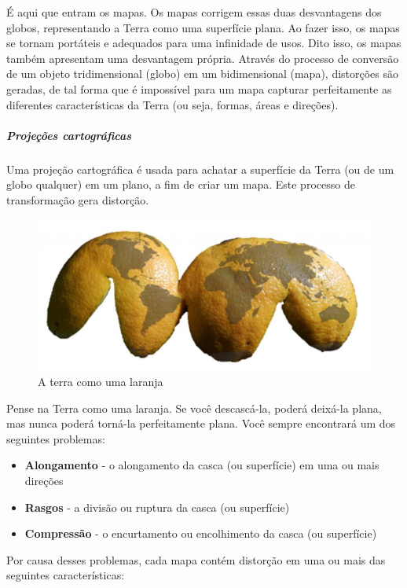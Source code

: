 \documentclass[
]{book}
\providecommand{\tightlist}{%
  \setlength{\itemsep}{0pt}\setlength{\parskip}{0pt}}
\begin{document}
É aqui que entram os mapas. Os mapas corrigem essas duas desvantagens dos globos, representando a Terra como uma superfície plana. Ao fazer isso, os mapas se tornam portáteis e adequados para uma infinidade de usos. Dito isso, os mapas também apresentam uma desvantagem própria. Através do processo de conversão de um objeto tridimensional (globo) em um bidimensional (mapa), distorções são geradas, de tal forma que é impossível para um mapa capturar perfeitamente as diferentes características da Terra (ou seja, formas, áreas e direções).

\hypertarget{projeuxe7uxf5es-cartogruxe1ficas}{%
\subparagraph{Projeções cartográficas}\label{projeuxe7uxf5es-cartogruxe1ficas}}

Uma projeção cartográfica é usada para achatar a superfície da Terra (ou de um globo qualquer) em um plano, a fim de criar um mapa. Este processo de transformação gera distorção.

\begin{figure}
\centering
\includegraphics{media/modulo0/dalandan.png}
\caption{A terra como uma laranja}
\end{figure}

Pense na Terra como uma laranja. Se você descascá-la, poderá deixá-la plana, mas nunca poderá torná-la perfeitamente plana. Você sempre encontrará um dos seguintes problemas:

\begin{itemize}
\tightlist
\item
  \textbf{Alongamento} - o alongamento da casca (ou superfície) em uma ou mais direções
\item
  \textbf{Rasgos} - a divisão ou ruptura da casca (ou superfície)
\item
  \textbf{Compressão} - o encurtamento ou encolhimento da casca (ou superfície)
\end{itemize}

Por causa desses problemas, cada mapa contém distorção em uma ou mais das seguintes características:
\end{document}
